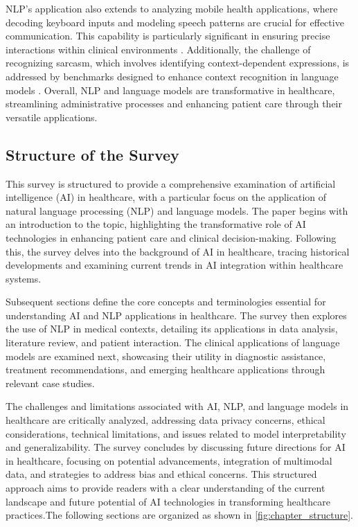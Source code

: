 NLP's application also extends to analyzing mobile health applications, where decoding keyboard inputs and modeling speech patterns are crucial for effective communication. This capability is particularly significant in ensuring precise interactions within clinical environments \cite{ouyang2017mobilekeyboardinputdecoding}. Additionally, the challenge of recognizing sarcasm, which involves identifying context-dependent expressions, is addressed by benchmarks designed to enhance context recognition in language models \cite{nimase2024morecontextshelpsarcasm}. Overall, NLP and language models are transformative in healthcare, streamlining administrative processes and enhancing patient care through their versatile applications.



\subsection{Structure of the Survey} \label{subsec:Structure of the Survey}



This survey is structured to provide a comprehensive examination of artificial intelligence (AI) in healthcare, with a particular focus on the application of natural language processing (NLP) and language models. The paper begins with an introduction to the topic, highlighting the transformative role of AI technologies in enhancing patient care and clinical decision-making. Following this, the survey delves into the background of AI in healthcare, tracing historical developments and examining current trends in AI integration within healthcare systems.



Subsequent sections define the core concepts and terminologies essential for understanding AI and NLP applications in healthcare. The survey then explores the use of NLP in medical contexts, detailing its applications in data analysis, literature review, and patient interaction. The clinical applications of language models are examined next, showcasing their utility in diagnostic assistance, treatment recommendations, and emerging healthcare applications through relevant case studies.



The challenges and limitations associated with AI, NLP, and language models in healthcare are critically analyzed, addressing data privacy concerns, ethical considerations, technical limitations, and issues related to model interpretability and generalizability. The survey concludes by discussing future directions for AI in healthcare, focusing on potential advancements, integration of multimodal data, and strategies to address bias and ethical concerns. This structured approach aims to provide readers with a clear understanding of the current landscape and future potential of AI technologies in transforming healthcare practices.The following sections are organized as shown in \autoref{fig:chapter_structure}.




